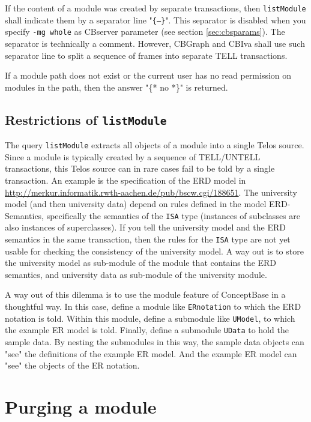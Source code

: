 If the content of a module was created by separate transactions, then
{\tt listModule} shall indicate them by a separator line "{\tt \{---\}}".
This separator is disabled when you specify {\tt -mg whole}
as CBserver parameter (see section \ref{sec:cbsparams}).
The separator is technically a comment. However, CBGraph and CBIva
shall use such separator line to split a sequence
of frames into separate TELL transactions.

If a module path does not exist or the current user has no
read permission on modules in the path, then the answer
"\{* no *\}" is returned.

\subsection{Restrictions of {\tt listModule}} \label{sec:listmod}

The query {\tt listModule} extracts all objects of a module into a single
Telos source. Since a module is typically created by a sequence of
TELL/UNTELL transactions, this Telos source can in rare cases fail to
be told by a single transaction. An example is the specification of
the ERD model in 
\url{http://merkur.informatik.rwth-aachen.de/pub/bscw.cgi/188651}.
The university model (and then university data) depend on rules
defined in the model ERD-Semantics, specifically the semantics of
the {\tt ISA} type (instances of subclasses are also instances
of superclasses). If you tell the university model and the ERD semantics in
the same transaction, then the rules for the {\tt ISA} type are not yet 
usable for checking the consistency of the university model.
A way out is to store the university model as sub-module of 
the module that contains the ERD semantics, and university data
as sub-module of the university module.

A way out of this dilemma is to use the module feature of ConceptBase
in a thoughtful way. In this case, define a module like {\tt ERnotation}
to which the ERD notation is told. Within this module, define a submodule
like {\tt UModel}, to which the example ER model is told. Finally,
define a submodule {\tt UData} to hold the sample data. By nesting the
submodules in this way, the sample data objects can "see" the definitions
of the example ER model. And the example ER model can "see" the objects
of the ER notation.

\section{Purging a module} \label{sec:module_purge}

